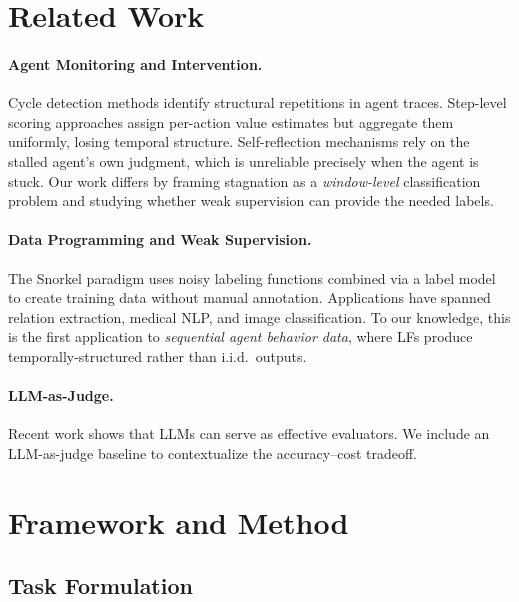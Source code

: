 \documentclass[11pt]{article}
\begin{document}
\section{Related Work}
\label{sec:related}

\paragraph{Agent Monitoring and Intervention.}
Cycle detection methods identify structural repetitions in agent traces.
Step-level scoring approaches assign per-action value estimates but aggregate them uniformly, losing temporal structure.
Self-reflection mechanisms rely on the stalled agent's own judgment, which is unreliable precisely when the agent is stuck.
Our work differs by framing stagnation as a \emph{window-level} classification problem and studying whether weak supervision can provide the needed labels.

\paragraph{Data Programming and Weak Supervision.}
The Snorkel paradigm uses noisy labeling functions combined via a label model to create training data without manual annotation.
Applications have spanned relation extraction, medical NLP, and image classification.
To our knowledge, this is the first application to \emph{sequential agent behavior data}, where LFs produce temporally-structured rather than i.i.d.\ outputs.

\paragraph{LLM-as-Judge.}
Recent work shows that LLMs can serve as effective evaluators.
We include an LLM-as-judge baseline to contextualize the accuracy--cost tradeoff.

\section{Framework and Method}
\label{sec:method}

\subsection{Task Formulation}
\end{document}
